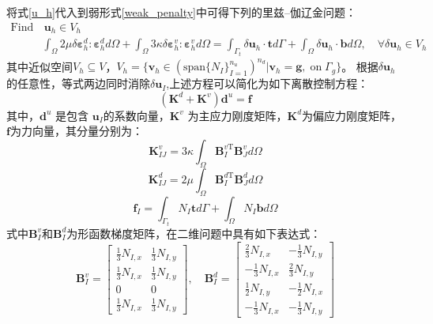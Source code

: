 将式\eqref{u_h}代入到弱形式\eqref{weak_penalty}中可得下列的里兹--伽辽金问题：
\begin{equation}\label{ritz_penalty}
    \begin{split}
        \text{Find}&\, \boldsymbol u_h \in V_h\\
        &\int_\Omega 2\mu \delta \boldsymbol \varepsilon^d_h : \boldsymbol \varepsilon^d_h d\Omega +
        \int_\Omega 3\kappa \delta \boldsymbol \varepsilon^v_h : \boldsymbol \varepsilon^v_h d\Omega =
        \int_{\Gamma_t} \delta \boldsymbol u_h \cdot \boldsymbol t d\Gamma + \int_\Omega \delta         \boldsymbol u_h \cdot \boldsymbol b d\Omega, \quad
        \forall \delta \boldsymbol u_h \in V_h
    \end{split}
\end{equation}
其中近似空间$V_h \subseteq V$，$V_h = \{\boldsymbol v_h \in (\mathrm{span}\{N_I\}_{I=1}^{n_u})^{n_d} \vert \boldsymbol v_h = \boldsymbol g,\; \mathrm{on} \; \Gamma_g\}$。
根据$\delta \boldsymbol u_h$的任意性，等式两边同时消除$\delta \boldsymbol u_I$,上述方程可以简化为如下离散控制方程：
\begin{equation}\label{equilibrium_penalty}
    (\boldsymbol K^d +\boldsymbol K^v) \boldsymbol d^u = \boldsymbol f
\end{equation}
其中，$\boldsymbol d^u$ 是包含 $\boldsymbol u_I$的系数向量，$\boldsymbol K^v$ 为主应力刚度矩阵，$\boldsymbol K^d$为偏应力刚度矩阵，$\boldsymbol f$为力向量，其分量分别为：
\begin{equation}\label{stiffness_vol}
    \boldsymbol K^v_{IJ}=  3\kappa\int_{\Omega} \boldsymbol B^{v\mathrm T}_I \boldsymbol B^v_J d\Omega
\end{equation}
\begin{equation}\label{stiffness_dev}
    \boldsymbol K^d_{IJ}= 2\mu\int_{\Omega} \boldsymbol B^{d\mathrm T}_I \boldsymbol B^d_J d\Omega
\end{equation}
\begin{equation}
    \boldsymbol f_I = \int_{\Gamma_t} N_I \boldsymbol t d\Gamma + \int_{\Omega} N_I \boldsymbol b d\Omega
\end{equation}
式中$\boldsymbol B^v_I$和$\boldsymbol B^d_I$为形函数梯度矩阵，在二维问题中具有如下表达式：
\begin{equation}
    \boldsymbol{B}^v_I= \left[\begin{matrix}
        \frac{1}{3}N_{I,x}&\frac{1}{3}N_{I,y}\\
        \frac{1}{3}N_{I,x}&\frac{1}{3}N_{I,y}\\
        0&0\\
        \frac{1}{3}N_{I,x}&\frac{1}{3}N_{I,y}
    \end{matrix}\right] ,\quad
    \boldsymbol{B}^d_I= \left[\begin{matrix}
        \frac{2}{3}N_{I,x}&-\frac{1}{3}N_{I,y}\\
        -\frac{1}{3}N_{I,x}&\frac{2}{3}N_{I,y}\\
        \frac{1}{2}N_{I,y}&-\frac{1}{2}N_{I,x}\\
        -\frac{1}{3}N_{I,x}&-\frac{1}{3}N_{I,y}
    \end{matrix}\right]
\end{equation}

